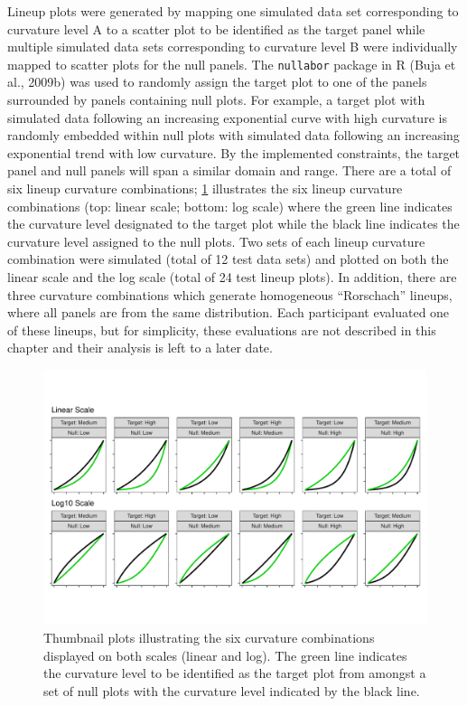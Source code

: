 \documentclass[print]{nuthesis}
\begin{document}
Lineup plots were generated by mapping one simulated data set corresponding to curvature level A to a scatter plot to be identified as the target panel while multiple simulated data sets corresponding to curvature level B were individually mapped to scatter plots for the null panels.
The \texttt{nullabor} package in R (Buja et al., 2009b) was used to randomly assign the target plot to one of the panels surrounded by panels containing null plots.
For example, a target plot with simulated data following an increasing exponential curve with high curvature is randomly embedded within null plots with simulated data following an increasing exponential trend with low curvature.
By the implemented constraints, the target panel and null panels will span a similar domain and range.
There are a total of six lineup curvature combinations; \cref{fig:curvature-combination-example} illustrates the six lineup curvature combinations (top: linear scale; bottom: log scale) where the green line indicates the curvature level designated to the target plot while the black line indicates the curvature level assigned to the null plots.
Two sets of each lineup curvature combination were simulated (total of 12 test data sets) and plotted on both the linear scale and the log scale (total of 24 test lineup plots).
In addition, there are three curvature combinations which generate homogeneous ``Rorschach'' lineups, where all panels are from the same distribution.
Each participant evaluated one of these lineups, but for simplicity, these evaluations are not described in this chapter and their analysis is left to a later date.

\begin{figure}[tbp]

{\centering \includegraphics[width=1\linewidth,]{thesis_files/figure-latex/curvature-combination-example-1} 

}

\caption[Lineup curvature combinations]{Thumbnail plots illustrating the six curvature combinations displayed on both scales (linear and log). The green line indicates the curvature level to be identified as the target plot from amongst a set of null plots with the curvature level indicated by the black line.}\label{fig:curvature-combination-example}
\end{figure}
\end{document}

